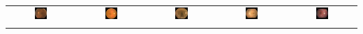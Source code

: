 \begin{frame}
{\begin{tabular}{@{}c@{}@{}c@{}@{}c@{}@{}c@{}@{}c@{}}
	\includegraphics[width=0.2\textwidth]{pics/classified_samples/197_left_0.jpg} &
	\includegraphics[width=0.2\textwidth]{pics/classified_samples/204_right_1.jpg} &
	\includegraphics[width=0.2\textwidth]{pics/classified_samples/82_right_2.jpg} &
	\includegraphics[width=0.2\textwidth]{pics/classified_samples/687_right_3.jpg} &
	\includegraphics[width=0.2\textwidth]{pics/classified_samples/2496_left_4.jpg} \\\noalign{\vspace{-0.15cm}}


\end{tabular}}
\end{frame}
